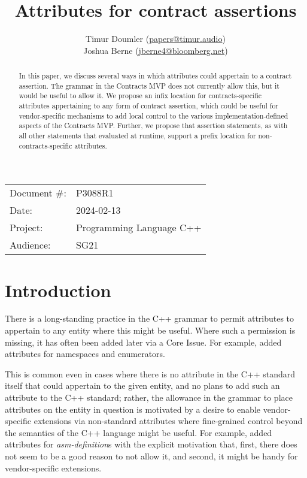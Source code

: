 

 \usepackage[bottom]{footmisc} 


\title{Attributes for contract assertions}
\author{ Timur Doumler \small(\href{mailto:papers@timur.audio}{papers@timur.audio})  \\
Joshua Berne \small(\href{mailto:jberne4@bloomberg.net}{jberne4@bloomberg.net})
}
\date{}
\maketitle

\begin{tabular}{ll}
Document \#: & P3088R1 \\
Date: &2024-02-13 \\
Project: & Programming Language C++ \\
Audience: & SG21
\end{tabular}

\begin{abstract}
In this paper, we discuss several ways in which attributes could appertain to a contract assertion. The grammar in the Contracts MVP does not currently allow this, but it would be useful to allow it. We propose an infix location for contracts-specific attributes appertaining to any form of contract assertion, which could be useful for vendor-specific mechanisms to add local control to the various implementation-defined aspects of the Contracts MVP.  Further, we propose that assertion statements, as with all other statements that evaluated at runtime, support a prefix location for non-contracts-specific attributes.
\end{abstract}

\section{Introduction}
\label{sec:intro}

There is a long-standing practice in the C++ grammar to permit attributes to appertain to any entity where this might be useful. Where such a permission is missing, it has often been added later via a Core Issue. For example, \cite{CWG1657} added attributes for namespaces and enumerators.

This is common even in cases where there is no attribute in the C++ standard itself that could appertain to the given entity, and no plans to add such an attribute to the C++ standard; rather, the allowance in the grammar to place attributes on the entity in question is motivated by a desire to enable vendor-specific extensions via non-standard attributes where fine-grained control beyond the semantics of the C++ language might be useful. For example, \cite{CWG2262} added attributes for \emph{asm-definition}s with the explicit motivation that, first, there does not seem to be a good reason to not allow it, and second, it might be handy for vendor-specific extensions.

